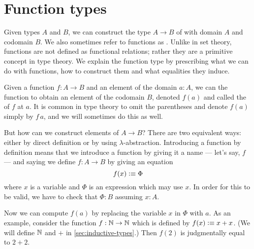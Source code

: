\section{Function types}
\label{sec:function-types}

%
%
Given types $A$ and $B$, we can construct the type $A \to B$ of 
%
%
%
with domain $A$ and codomain $B$.
We also sometimes refer to functions as .
%
%
%
%
%
Unlike in set theory, functions are not defined as
functional relations; rather they are a primitive concept in type theory.
We explain the function type by prescribing what we can do with functions, 
how to construct them and what equalities they induce.

Given a function $f : A \to B$ and an element of the domain $a : A$, we
can 
%
%
the function to obtain an element of the codomain $B$,
denoted $f(a)$ and called the  of $f$ at $a$.
%
It is common in type theory to omit the parentheses and denote $f(a)$ simply by $f\,a$, and we will sometimes do this as well.

But how can we construct elements of $A \to B$? There are two equivalent ways:
either by direct definition or by using
$\lambda$-abstraction. Introducing a function by definition
%
means that
we introduce a function by giving it a name --- let's say, $f$ --- and saying
we define $f : A \to B$ by giving an equation
\begin{equation}
  \label{eq:expldef}
  f(x) \defeq \Phi
\end{equation}
where $x$ is a variable
%
and $\Phi$ is an expression which may use $x$.
In order for this to be valid, we have to check that $\Phi : B$ assuming $x:A$.

Now we can compute $f(a)$ by replacing the variable $x$ in $\Phi$ with
$a$. As an example, consider the function $f : \mathbb{N} \to \mathbb{N}$ which is
defined by $f(x) \vcentcolon\equiv x+x$.  (We will define $\mathbb{N}$ and $+$ in \autoref{sec:inductive-types}.)
Then $f(2)$ is judgmentally equal to $2+2$.

